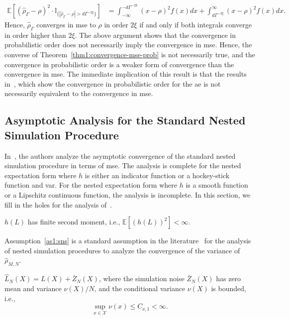 \begin{align*}
    \mathbb{E} \left[ \left(\hat{\rho}_{\Gamma} - \rho\right)^2 \cdot \mathbb{I}_{\{|\hat{\rho}_{\Gamma} - \rho| > d\Gamma^{-2\xi}\}} \right] 
    & = \int_{-\infty}^{-d\Gamma^{-2k}} (x - \rho)^2 f(x) dx + \int_{d\Gamma^{-2\xi}}^{\infty} (x - \rho)^2 f(x) dx.
\end{align*}
Hence, $\hat{\rho}_{\Gamma}$ converges in \gls{mse} to $\rho$ in order $2\xi$ if and only if both integrals converge in order higher than $2\xi$. 
The above argument shows that the convergence in probabilistic order does not necessarily imply the convergence in \gls{mse}.
Hence, the converse of Theorem~\ref{thm1:convergence-mse-prob} is not necessarily true, and the convergence in probabilistic order is a weaker form of convergence than the convergence in \gls{mse}.
The immediate implication of this result is that the results in~\cite{wang2022smooth}, which show the convergence in probabilistic order for the \gls{ae} is not necessarily equivalent to the convergence in \gls{mse}.

\subsection{Asymptotic Analysis for the Standard Nested Simulation Procedure}\label{sec1:sns}
In~\cite{gordy2010nested}, the authors analyze the asymptotic convergence of the standard nested simulation procedure in terms of \gls{mse}. 
The analysis is complete for the nested expectation form where $h$ is either an indicator function or a hockey-stick function and \gls{var}. 
For the nested expectation form where $h$ is a smooth function or a Lipschitz continuous function, the analysis is incomplete.
In this section, we fill in the holes for the analysis of~\cite{gordy2010nested}.

\begin{assumption}\label{as1:sns}
    $h(L)$ has finite second moment, i.e., $\mathbb{E} \left[ \left( h(L) \right)^2 \right] < \infty$.
\end{assumption}

Assumption~\ref{as1:sns} is a standard assumption in the literature~\citep{hong2017kernel} for the analysis of nested simulation procedures to analyze the convergence of the variance of $\hat{\rho}_{M, N}$.

\begin{assumption}\label{as1:sns-noise}
    $\hat{L}_N(X) = L(X) + \bar{Z}_N(X)$, where the simulation noise $\bar{Z}_N(X)$ has zero mean and variance $\nu(X) / N$, and the conditional variance $\nu(X)$ is bounded, i.e., 
    $$
        \sup_{x \in \mathcal{X}} \nu(x) \leq C_{\nu, 1} < \infty.
    $$
\end{assumption}


